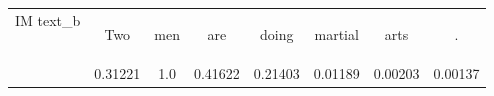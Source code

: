 \documentclass{article}
\begin{document}
\begin{CJK*}{UTF8}{gbsn}
\begin{table}[H]
{\begin{tabular}{|l|c|c|c|c|c|c|c|}
\multirow{2}{*}{IM
text\_b} & \colorbox{orange!31.221}{\strut Two} & \colorbox{orange!100.0}{\strut men} & \colorbox{orange!41.622}{\strut are} & \colorbox{orange!21.403}{\strut doing} & \colorbox{orange!1.189}{\strut martial} & \colorbox{orange!0.203}{\strut arts} & \colorbox{orange!0.13699999999999998}{\strut .} \\
 & 0.31221 & 1.0 & 0.41622 & 0.21403 & 0.01189 & 0.00203 & 0.00137 \\ \hline

\end{tabular}%
}
\end{table}


\end{CJK*}
    
\end{document}
